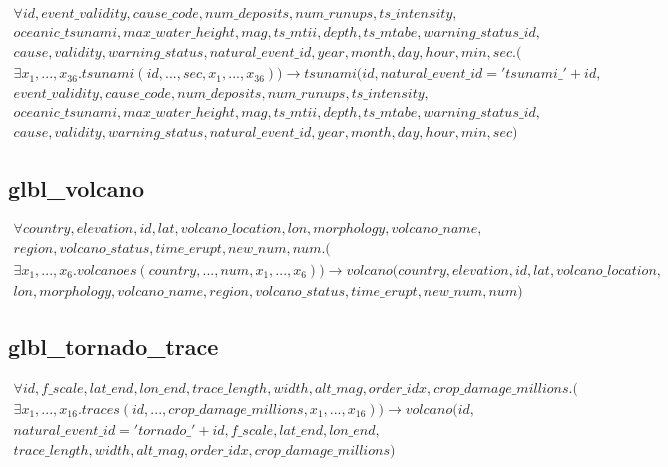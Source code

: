 \documentclass{article}
\begin{document}
\begin{multline}
\forall id, event\_validity, cause\_code, num\_deposits, num\_runups, ts\_intensity, \\ oceanic\_tsunami, max\_water\_height, mag, ts\_mtii, depth, ts\_mtabe, warning\_status\_id, \\ cause, validity, warning\_status, natural\_event\_id, year, month, day, hour, min, sec.( \\
\exists x_1, ..., x_{36}. tsunami(id, ..., sec, x_1, ..., x_{36})) \longrightarrow tsunami(id , natural\_event\_id = 'tsunami\_' + id, \\ event\_validity, cause\_code, num\_deposits, num\_runups, ts\_intensity, \\ oceanic\_tsunami, max\_water\_height, mag, ts\_mtii, depth, ts\_mtabe, warning\_status\_id, \\ cause, validity, warning\_status, natural\_event\_id, year,  month, day, hour, min, sec)
\end{multline} 


\subsection{glbl\_volcano}

\begin{multline}
\forall country, elevation, id, lat, volcano\_location, lon, morphology, volcano\_name, \\ region, volcano\_status, time\_erupt, new\_num, num.( \\
\exists x_1, ..., x_{6}. volcanoes(country, ..., num, x_1, ..., x_{6})) \longrightarrow volcano(country, elevation, id, lat, volcano\_location, \\ lon, morphology, volcano\_name, region, volcano\_status, time\_erupt, new\_num, num)
\end{multline} 

\subsection{glbl\_tornado\_trace}


\begin{multline}
\forall id, f\_scale, lat\_end, lon\_end, trace\_length, width, alt\_mag, order\_idx, crop\_damage\_millions.( \\
\exists x_1, ..., x_{16}. traces(id, ..., crop\_damage\_millions, x_1, ..., x_{16})) \longrightarrow volcano(id , \\ natural\_event\_id = 'tornado\_' + id, f\_scale, lat\_end, lon\_end, \\ trace\_length, width, alt\_mag, order\_idx, crop\_damage\_millions)
\end{multline} 
\end{document}
